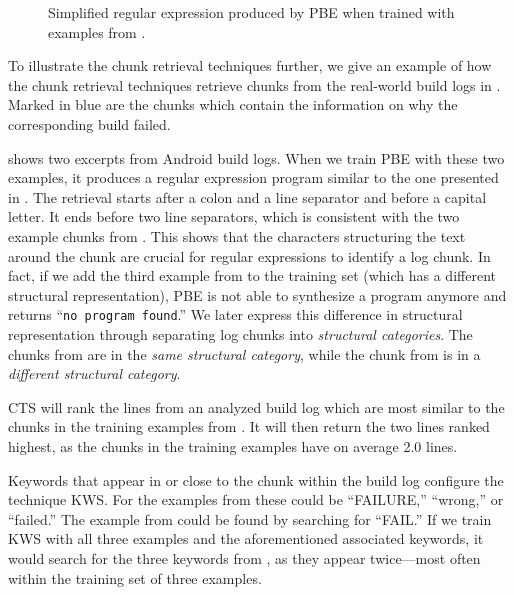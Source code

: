 \begin{figure}[tbp]
  \centering
  
  \caption{Simplified regular expression produced by PBE when trained
  with examples from .}
  \label{lst:prose-program-simplified}
\end{figure}


To illustrate the chunk retrieval techniques further, we give
an example of how the chunk retrieval techniques retrieve chunks from
the real-world build logs in .
Marked in blue are the chunks
which contain the information on why the
corresponding build failed.

 shows two excerpts
from Android build logs.
When we train PBE with these two examples, it produces
a regular expression program similar to the one presented in
.
The retrieval
starts after a colon and a line separator and before a capital
letter.
It ends before two line separators,
which is consistent with the two example
chunks from .
This shows that the characters structuring the text around the chunk are
crucial for regular expressions to identify a log chunk.
In fact, if we add the third example from 
to the training set (which has a
different structural representation),
PBE is not able to synthesize a program anymore and returns
``\texttt{no program found}.''
We later express this difference in structural representation through
separating log chunks into \emph{structural categories}.
The chunks from 
are in the \emph{same structural category}, while the chunk from
 is in a
\emph{different structural category}.

CTS will rank the lines from an analyzed build log which are most
similar to the chunks in the training examples
from .
It will then return the two lines ranked highest, as the chunks in
the training examples have on average 2.0 lines.

Keywords that appear in or close to the chunk within
the build log configure the technique KWS\@.
For the examples from  these could be
``FAILURE,'' ``wrong,'' or ``failed.''
The example from  could be found
by searching for ``FAIL.''
If we train KWS with all three examples and the aforementioned
associated keywords, it would search for the three keywords from
, as they appear twice---most often within
the training set of three examples.

